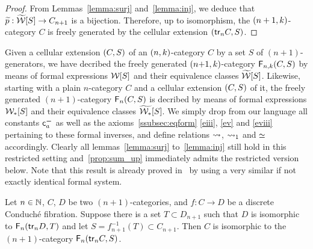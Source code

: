 \begin{proof}
  From Lemmas~\ref{lemma:surj} and~\ref{lemma:inj}, we deduce that
  $\widetilde{p}:\widetilde{\mathcal{W}}[S]\to C_{n+1}$ is a bijection. Therefore, up to
  isomorphism, the $(n+1,k)$-category $C$ is freely generated by the cellular
  extension $(\mathsf{tr}_{n}C,S)$.
\end{proof}
\begin{remark}\label{remark:ncat}
 Given a cellular extension $(C,S)$ of an $(n,k)$-category $C$ by
 a set $S$ of $(n{+}1)$-generators, we have decribed the freely
 generated $(n{+}1,k)$-category $\mathsf{F}_{n,k}(C,S)$ by means of
 formal expressions $\mathcal{W}[S]$ and their equivalence classes $\widetilde{\mathcal{W}}[S]$. Likewise, starting with a plain $n$-category $C$ and a cellular
 extension $(C,S)$ of it, the freely generated $(n{+}1)$-category
 $\mathsf{F}_{n}(C,S)$  is decribed by means of formal expressions $\mathcal{W}_*[S]$
 and their equivalence classes $\widetilde{\mathcal{W}_*}[S]$. We simply drop from our
 language all  constants $\mathsf{c}^{\boldsymbol{-}}_{a}$ as well as the
 axioms~\ref{ssubsec:eqform} \ref{eiii}, \ref{ev} and \ref{eviii} 
 pertaining to these formal inverses, and define relations $\leadsto$,
 $\leadsto_1$ and $\simeq$ accordingly. Clearly all lemmas~\ref{lemma:surj}
 to~\ref{lemma:inj} still hold in this restricted setting
 and~\cref{prop:sum_up} immediately admits the restricted
 version below. Note that this result is already proved
 in~\cite{guetta:poldcf} by using a very similar if not exactly
 identical formal system.
\end{remark}
\begin{proposition}\label{prop:sum_up_restr}
  Let $n\in\mathbb N$, $C$, $D$ be two $(n{+}1)$-categories, and $f:C\to D$ be a
  discrete Conduché fibration. Suppose there is a set $T\subset D_{n+1}$ such
  that $D$ is isomorphic to $\mathsf{F}_{n}(\mathsf{tr}_{n}D,T)$ and  let
  $S=f_{n+1}^{-1}(T)\subset C_{n+1}$. Then $C$ is isomorphic to the
  $(n{+}1)$-category $\mathsf{F}_{n}(\mathsf{tr}_{n}C,S)$.
\end{proposition}

